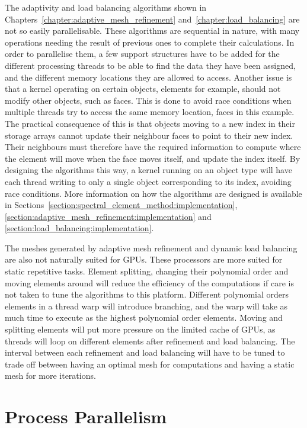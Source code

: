 The adaptivity and load balancing algorithms shown in
Chapters~\ref{chapter:adaptive_mesh_refinement} and~\ref{chapter:load_balancing} are not so easily
parallelisable. These algorithms are sequential in nature, with many operations needing the result
of previous ones to complete their calculations. In order to parallelise them, a few support
structures have to be added for the different processing threads to be able to find the data they
have been assigned, and the different memory locations they are allowed to access. Another issue is
that a kernel operating on certain objects, elements for example, should not modify other objects,
such as faces. This is done to avoid race conditions when multiple threads try to access the same
memory location, faces in this example. The practical consequence of this is that objects moving to
a new index in their storage arrays cannot update their neighbour faces to point to their new index.
Their neighbours must therefore have the required information to compute where the element will move
when the face moves itself, and update the index itself. By designing the algorithms this way, a
kernel running on an object type will have each thread writing to only a single object corresponding
to its index, avoiding race conditions. More information on how the algorithms are designed is
available in Sections~\ref{section:spectral_element_method:implementation},
\ref{section:adaptive_mesh_refinement:implementation} and
\ref{section:load_balancing:implementation}.

The meshes generated by adaptive mesh refinement and dynamic load balancing are also not naturally
suited for GPUs. These processors are more suited for static repetitive tasks. Element splitting,
changing their polynomial order and moving elements around will reduce the efficiency of the
computations if care is not taken to tune the algorithms to this platform. Different polynomial
orders elements in a thread warp will introduce branching, and the warp will take as much time to
execute as the highest polynomial order elements. Moving and splitting elements will put more
pressure on the limited cache of GPUs, as threads will loop on different elements after refinement
and load balancing. The interval between each refinement and load balancing will have to be tuned to
trade off between having an optimal mesh for computations and having a static mesh for more
iterations.

\section{Process Parallelism} \label{section:graphics_processing_units:process_parallelism}

